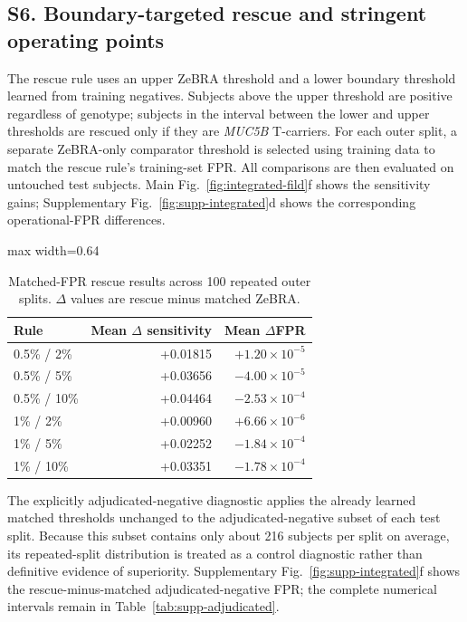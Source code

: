 \subsection*{S6. Boundary-targeted rescue and stringent operating points}
The rescue rule uses an upper ZeBRA threshold and a lower boundary threshold learned from training negatives. Subjects above the upper threshold are positive regardless of genotype; subjects in the interval between the lower and upper thresholds are rescued only if they are \textit{MUC5B} T-carriers. For each outer split, a separate ZeBRA-only comparator threshold is selected using training data to match the rescue rule's training-set FPR. All comparisons are then evaluated on untouched test subjects. Main Fig.~\ref{fig:integrated-fild}f shows the sensitivity gains; Supplementary Fig.~\ref{fig:supp-integrated}d shows the corresponding operational-FPR differences.

\begin{table}[!t]
\caption{Matched-FPR rescue results across 100 repeated outer splits. $\Delta$ values are rescue minus matched ZeBRA.}
\label{tab:supp-rescue}
\centering\small
\setlength{\tabcolsep}{3pt}
\renewcommand{\arraystretch}{1.04}
\begin{adjustbox}{max width=0.64\textwidth}
\begin{tabular}{lrr}
\toprule
Rule & Mean $\Delta$ sensitivity & Mean $\Delta$FPR\\
\midrule
0.5\% / 2\% & +0.01815 & $+1.20\times10^{-5}$\\
0.5\% / 5\% & +0.03656 & $-4.00\times10^{-5}$\\
0.5\% / 10\% & +0.04464 & $-2.53\times10^{-4}$\\
1\% / 2\% & +0.00960 & $+6.66\times10^{-6}$\\
1\% / 5\% & +0.02252 & $-1.84\times10^{-4}$\\
1\% / 10\% & +0.03351 & $-1.78\times10^{-4}$\\
\bottomrule
\end{tabular}
\end{adjustbox}
\end{table}

The explicitly adjudicated-negative diagnostic applies the already learned matched thresholds unchanged to the adjudicated-negative subset of each test split. Because this subset contains only about 216 subjects per split on average, its repeated-split distribution is treated as a control diagnostic rather than definitive evidence of superiority. Supplementary Fig.~\ref{fig:supp-integrated}f shows the rescue-minus-matched adjudicated-negative FPR; the complete numerical intervals remain in Table~\ref{tab:supp-adjudicated}.

